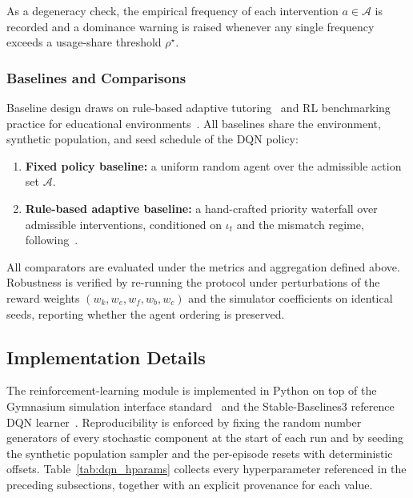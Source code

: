\medskip
As a degeneracy check, the empirical frequency of each intervention $a \in \mathcal{A}$ is recorded and a dominance warning is raised whenever any single frequency exceeds a usage-share threshold $\rho^{\star}$.

\subsubsection{Baselines and Comparisons}\label{sec:method_baselines}

Baseline design draws on rule-based adaptive tutoring~\cite{nandimandalam_ai-powered_2025} and \ac{RL} benchmarking practice for educational environments~\cite{govea_implementation_2024}. All baselines share the environment, synthetic population, and seed schedule of the \ac{DQN} policy:
\begin{enumerate}
    \item \textbf{Fixed policy baseline:} a uniform random agent over the admissible action set $\mathcal{A}$.
    \item \textbf{Rule-based adaptive baseline:} a hand-crafted priority waterfall over admissible interventions, conditioned on $\iota_t$ and the mismatch regime, following~\cite{nandimandalam_ai-powered_2025}.
\end{enumerate}
All comparators are evaluated under the metrics and aggregation defined above. Robustness is verified by re-running the protocol under perturbations of the reward weights $(w_k, w_e, w_f, w_b, w_c)$ and the simulator coefficients on identical seeds, reporting whether the agent ordering is preserved.
\subsection{Implementation Details}\label{sec:method_rl_implementation}

The reinforcement-learning module is implemented in Python on top of the Gymnasium simulation interface standard~\cite{towers_gymnasium_2023} and the Stable-Baselines3 reference \ac{DQN} learner~\cite{raffin_sb3_2021}. Reproducibility is enforced by fixing the random number generators of every stochastic component at the start of each run and by seeding the synthetic population sampler and the per-episode resets with deterministic offsets. Table~\ref{tab:dqn_hparams} collects every hyperparameter referenced in the preceding subsections, together with an explicit provenance for each value.

